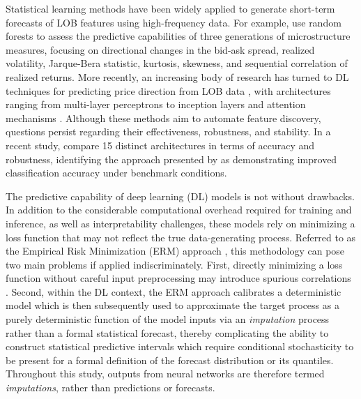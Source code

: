 \documentclass{rQUF2e}
\theoremstyle{plain}
\theoremstyle{definition}
\theoremstyle{remark}
\begin{document}
Statistical learning methods have been widely applied to generate short-term forecasts of LOB features using high-frequency data. For example, \citet{easley2021microstructure} use random forests to assess the predictive capabilities of three generations of microstructure measures, focusing on directional changes in the bid-ask spread, realized volatility, Jarque-Bera statistic, kurtosis, skewness, and sequential correlation of realized returns. More recently, an increasing body of research has turned to DL techniques for predicting price direction from LOB data \citep{tsantekidis2017using, Zhang_2019, zhang2021deeplearningmarketorder, kolm2023deep, kolm2024improving, briola2024deep, prata2024lob}, with architectures ranging from multi-layer perceptrons \citep{tsantekidis2017using} to inception layers \citep{Zhang_2019} and attention mechanisms \citep{zhang2021deeplearningmarketorder}. Although these methods aim to automate feature discovery, questions persist regarding their effectiveness, robustness, and stability. In a recent study, \citet{prata2024lob} compare 15 distinct architectures in terms of accuracy and robustness, identifying the approach presented by \citet{zhang2021deeplearningmarketorder} as demonstrating improved classification accuracy under benchmark conditions.

The predictive capability of deep learning (DL) models is not without drawbacks. In addition to the considerable computational overhead required for training and inference, as well as interpretability challenges, these models rely on minimizing a loss function that may not reflect the true data-generating process. Referred to as the Empirical Risk Minimization (ERM) approach \citep{breiman2001statistical}, this methodology can pose two main problems if applied indiscriminately. First, directly minimizing a loss function without careful input preprocessing may introduce spurious correlations \citep{granger1974spurious, phillips1986understanding}. Second, within the DL context, the ERM approach calibrates a deterministic model which is then subsequently used to approximate the target process as a purely deterministic function of the model inputs via an \emph{imputation} process rather than a formal statistical forecast, thereby complicating the ability to construct statistical predictive intervals which require conditional stochasticity to be present for a formal definition of the forecast distribution or its quantiles. Throughout this study, outputs from neural networks are therefore termed \emph{imputations}, rather than predictions or forecasts.
\end{document}

